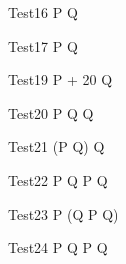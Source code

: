  \begin{circus}
    \circprocess Test16 \circdef  P \circendby {} \rcirctime  \circseq Q \circendby {} \rcirctime\\
 \end{circus}





\begin{circus}
    \circprocess Test17 \circdef  P \circtimeout {} \rcirctime Q  \\
 \end{circus}


\begin{circus}
   \circprocess Test19 \circdef  P \circtimeout {} + 20 \rcirctime Q  \\
\end{circus}


\begin{circus}
   \circprocess Test20 \circdef  P \circseq Q \circtimeout {} \rcirctime Q  \\
\end{circus}

\begin{circus}
   \circprocess Test21 \circdef  (P \circseq Q) \circtimeout {} \rcirctime Q \\
\end{circus}

\begin{circus}
   \circprocess Test22 \circdef  P \circseq Q \circtimeout {} \rcirctime  P \circseq Q \\
\end{circus}

\begin{circus}
   \circprocess Test23 \circdef  P \circseq (Q \circtimeout {} \rcirctime P \circseq Q)\\
\end{circus}

\begin{circus}
   \circprocess Test24 \circdef  P \circtimeout {} \rcirctime Q \circtimeout {} \rcirctime P \circseq Q\\
\end{circus}



